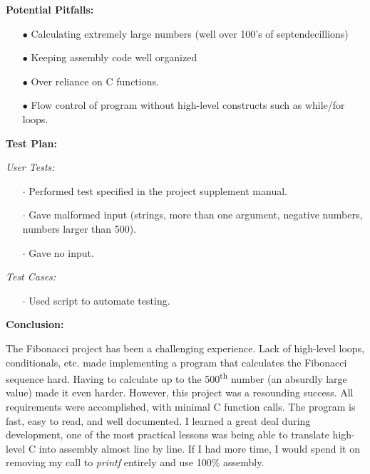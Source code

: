 \documentclass{article}
\begin{document}
\begin{flushleft}
\textbf{Potential Pitfalls:}
\vspace{.5pc}
\end{flushleft}

\begin{itemize}
	\item[$\bullet$] Calculating extremely large numbers (well over 100's of 
	septendecillions)
	\item[$\bullet$] Keeping assembly code well organized
	\item[$\bullet$] Over reliance on C functions.
	\item[$\bullet$] Flow control of program without high-level constructs 
	such as while/for loops.
\end{itemize}
\vspace{.5pc}

\begin{flushleft}
\textbf{Test Plan:}
\vspace{.5pc}
\end{flushleft}

\textit{User Tests:}
\begin{itemize}
	\item[$\cdot$] Performed test specified in the project supplement manual.
	\item[$\cdot$] Gave malformed input (strings, more than one argument, 
	negative numbers, numbers larger than 500).
	\item[$\cdot$] Gave no input.
\end{itemize}

\textit{Test Cases:}
\begin{itemize}
	\item[$\cdot$] Used script to automate testing.
	\end{itemize}
\vspace{.5pc}

\begin{flushleft}
\textbf{Conclusion:}
\vspace{.5pc}
\end{flushleft}
The Fibonacci project has been a challenging experience.  Lack of high-level
loops, conditionals, etc. made implementing a program that calculates the 
Fibonacci sequence hard. Having to calculate up to the 500\textsuperscript{th}
number (an absurdly large value) made it even harder.  However, this project 
was a resounding success.  All requirements were accomplished, with minimal
C function calls.  The program is fast, easy to read, and well documented.  I
learned a great deal during development, one of the most practical lessons was
being able to translate high-level C into assembly almost line by line.  If I 
had more time, I would spend it on removing my call to \textit{printf} 
entirely and use 100\% assembly.
\end{document}
